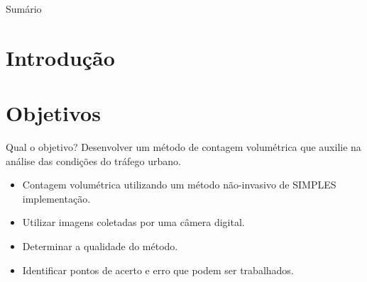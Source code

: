 \begin{frame}{Sumário}
  \tableofcontents
\end{frame}





\section{Introdução} %
\label{sec:introdu_o}



\section{Objetivos} %
\label{sec:objetivos}

\begin{frame}{Qual o objetivo?}
  Desenvolver um método de contagem volumétrica que auxilie na análise das condições do tráfego urbano.
  \pause

  \begin{itemize}
    \item Contagem volumétrica utilizando um método não-invasivo de \alert{SIMPLES} implementação.
    \item Utilizar imagens coletadas por uma câmera digital.
    \item Determinar a qualidade do método.
    \item Identificar pontos de acerto e erro que podem ser trabalhados.
  \end{itemize}
\end{frame}



